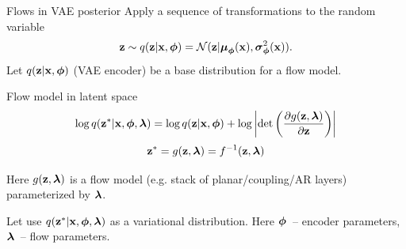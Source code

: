 \begin{frame}{Flows in VAE posterior}
	Apply a sequence of transformations to the random variable
	\[
	\mathbf{z} \sim q(\mathbf{z} | \mathbf{x}, \boldsymbol{\phi}) = \mathcal{N}(\mathbf{z}| \boldsymbol{\mu}_{\boldsymbol{\phi}}(\mathbf{x}), \boldsymbol{\sigma}^2_{\boldsymbol{\phi}}(\mathbf{x})).
	\]
	Let $q(\mathbf{z} | \mathbf{x}, \boldsymbol{\phi})$ (VAE encoder) be a base distribution for a flow model.
	
	\begin{block}{Flow model in latent space}
		\vspace{-0.3cm}
		\[
			\log q(\mathbf{z}^* | \mathbf{x}, \boldsymbol{\phi}, \boldsymbol{\lambda}) = \log q(\mathbf{z} | \mathbf{x}, \boldsymbol{\phi}) + \log \left | \det \left( \frac{\partial g(\mathbf{z}, \boldsymbol{\lambda})}{\partial \mathbf{z}}\right) \right|
		\]
		\[
			\mathbf{z}^* = g(\mathbf{z}, \boldsymbol{\lambda}) = f^{-1}(\mathbf{z}, \boldsymbol{\lambda})
		\]
	\end{block}
	Here $g(\mathbf{z}, \boldsymbol{\lambda})$ is a flow model (e.g. stack of planar/coupling/AR layers) parameterized by $\boldsymbol{\lambda}$.
	
	
	Let use $q(\mathbf{z}^* | \mathbf{x}, \boldsymbol{\phi}, \boldsymbol{\lambda})$ as a variational distribution. Here $\boldsymbol{\phi}$~-- encoder parameters, $\boldsymbol{\lambda}$~-- flow parameters.
	
\end{frame}
